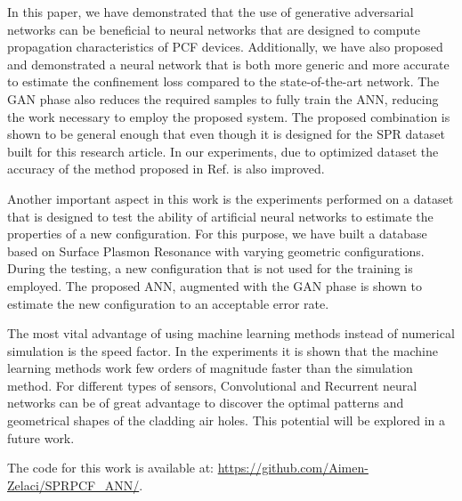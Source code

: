 \documentclass[journal]{IEEEtran}
\begin{document}
In this paper, we have demonstrated that the use of generative adversarial networks can be beneficial to neural networks that are designed to compute propagation characteristics of PCF devices. Additionally, we have also proposed and demonstrated a neural network that is both more generic and more accurate to estimate the confinement loss compared to the state-of-the-art network. The GAN phase also reduces the required samples to fully train the ANN, reducing the work necessary to employ the proposed system. The proposed combination is shown to be general enough that even though it is designed for the SPR dataset built for this research article. In our experiments, due to optimized dataset the accuracy of the method proposed in Ref. \cite{paper0} is also improved.

Another important aspect in this work is the experiments performed on a dataset that is designed to test the ability of artificial neural networks to estimate the properties of a new configuration. For this purpose, we have built a database based on Surface Plasmon Resonance with varying geometric configurations. During the testing, a new configuration that is not used for the training is employed. The proposed ANN, augmented with the GAN phase is shown to estimate the new configuration to an acceptable error rate.

The most vital advantage of using machine learning methods instead of numerical simulation is the speed factor. In the experiments it is shown that the machine learning methods work few orders of magnitude faster than the simulation method. For different types of sensors, Convolutional and Recurrent neural networks can be of great advantage to discover the optimal patterns and geometrical shapes of the cladding air holes. This potential will be explored in a future work.

The code for this work is available at: \url{https://github.com/Aimen-Zelaci/SPRPCF_ANN/}.


	
\end{document}
